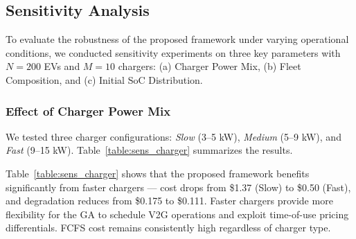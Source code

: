 \subsection{Sensitivity Analysis}

\noindent To evaluate the robustness of the proposed framework under varying operational conditions, we conducted sensitivity experiments on three key parameters with $N = 200$ EVs and $M = 10$ chargers: (a) Charger Power Mix, (b) Fleet Composition, and (c) Initial SoC Distribution.

\subsubsection{Effect of Charger Power Mix}
\noindent We tested three charger configurations: \textit{Slow} (3--5 kW), \textit{Medium} (5--9 kW), and \textit{Fast} (9--15 kW). Table~\ref{table:sens_charger} summarizes the results.

\begin{table}[h!]
    \centering
    \caption{Sensitivity to Charger Power Mix: Average cost and degradation per EV.}
    \label{table:sens_charger}
\end{table}

\noindent Table~\ref{table:sens_charger} shows that the proposed framework benefits significantly from faster chargers --- cost drops from \$1.37 (Slow) to \$0.50 (Fast), and degradation reduces from \$0.175 to \$0.111. Faster chargers provide more flexibility for the GA to schedule V2G operations and exploit time-of-use pricing differentials. FCFS cost remains consistently high regardless of charger type.

